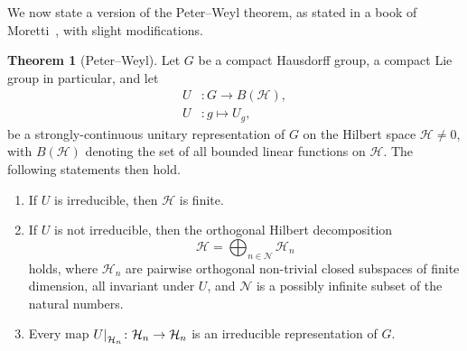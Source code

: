 \documentclass[12pt, a4 paper]{article}
\let\symcal\mathcal
\theoremstyle{definition}
\newtheorem{thm}{Theorem}
\newcommand{\hilbert}{\symcal{H}}
\newcommand\restr[2]{{%
        \left.\kern-\nulldelimiterspace %
        #1 %
        \littletaller %
        \right|_{#2} %
    }}
\newcommand{\littletaller}{\mathchoice{\vphantom{\big|}}{}{}{}}
\begin{document}
    We now state a version of the Peter--Weyl theorem, as stated in a book of Moretti~\cite[p.~287]{MorettiFundamental}, with slight modifications.

    \begin{thm}[Peter--Weyl]
        Let \(G\) be a compact Hausdorff group, a compact Lie group in particular, and let
        \begin{align*}
            U &\colon G \rightarrow B(\hilbert),\\
            U &\colon g \mapsto U_g,
        \end{align*}
        be a strongly-continuous unitary representation of $G$ on the Hilbert space $\hilbert \neq 0$, with $B(\hilbert)$ denoting the set of all bounded linear functions on $\hilbert$. The following statements then hold.
        \begin{enumerate}
            \item If \(U\) is irreducible, then \(\hilbert\) is finite.
            \item If \(U\) is not irreducible, then the orthogonal Hilbert decomposition
            \[
                \hilbert = \bigoplus_{n\in \symcal{N}} \hilbert_n
            \]
            holds, where \(\hilbert_n\) are pairwise orthogonal non-trivial closed subspaces of finite dimension, all invariant under \(U\), and \(\symcal{N}\) is a possibly infinite subset of the natural numbers.
            \item Every map \(\restr{U}{\hilbert_n} \colon \hilbert_n \rightarrow \hilbert_n\) is an irreducible representation of \(G\).
        \end{enumerate}
    \end{thm}
\end{document}
